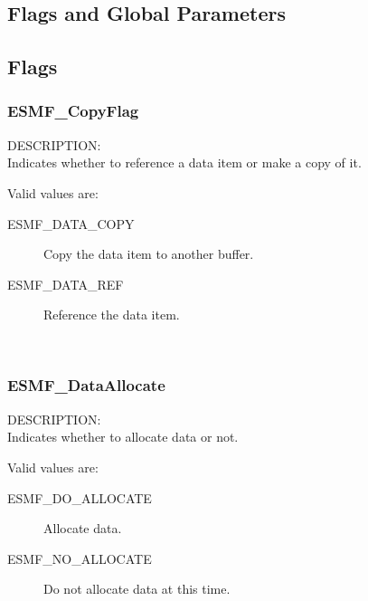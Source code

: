 
\subsection{Flags and Global Parameters}

\subsection{Flags}

\subsubsection{ESMF\_CopyFlag}

{\sf DESCRIPTION:\\}
Indicates whether to reference a data item or make a copy of it.

Valid values are:
\begin{description}

\item [ESMF\_DATA\_COPY] 
      Copy the data item to another buffer.

\item [ESMF\_DATA\_REF] 
      Reference the data item.
\end{description}


\mbox{}\hrulefill\

\subsubsection{ESMF\_DataAllocate}

{\sf DESCRIPTION:\\}  
Indicates whether to allocate data or not.

Valid values are:
\begin{description}

\item [ESMF\_DO\_ALLOCATE] 
      Allocate data. 

\item [ESMF\_NO\_ALLOCATE]
      Do not allocate data at this time. 
\end{description}


\mbox{}\hrulefill\
